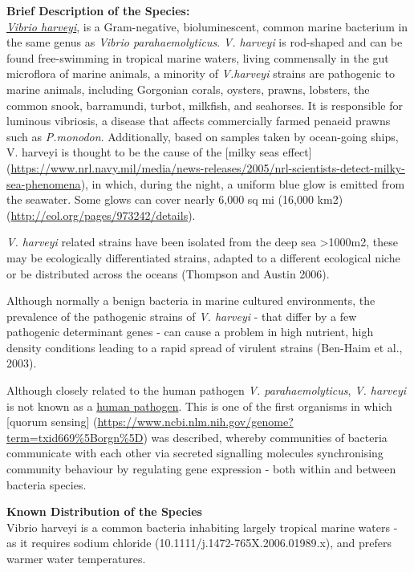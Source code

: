 \documentclass[]{book}
\theoremstyle{definition}
\theoremstyle{definition}
\theoremstyle{definition}
\theoremstyle{remark}
\begin{document}
\textbf{Brief Description of the Species:}\\
\href{http://eol.org/pages/973242/details}{\emph{Vibrio harveyi}}, is a
Gram-negative, bioluminescent, common marine bacterium in the same genus
as \emph{Vibrio parahaemolyticus}. \emph{V. harveyi} is rod-shaped and
can be found free-swimming in tropical marine waters, living commensally
in the gut microflora of marine animals, a minority of \emph{V.harveyi}
strains are pathogenic to marine animals, including Gorgonian corals,
oysters, prawns, lobsters, the common snook, barramundi, turbot,
milkfish, and seahorses. It is responsible for luminous vibriosis, a
disease that affects commercially farmed penaeid prawns such as
\emph{P.monodon}. Additionally, based on samples taken by ocean-going
ships, V. harveyi is thought to be the cause of the {[}milky seas
effect{]}
(\url{https://www.nrl.navy.mil/media/news-releases/2005/nrl-scientists-detect-milky-sea-phenomena}),
in which, during the night, a uniform blue glow is emitted from the
seawater. Some glows can cover nearly 6,000 sq mi (16,000 km2)
(\url{http://eol.org/pages/973242/details}).

\emph{V. harveyi} related strains have been isolated from the deep sea
\textgreater{}1000m2, these may be ecologically differentiated strains,
adapted to a different ecological niche or be distributed across the
oceans (Thompson and Austin 2006).

Although normally a benign bacteria in marine cultured environments, the
prevalence of the pathogenic strains of \emph{V. harveyi} - that differ
by a few pathogenic determinant genes - can cause a problem in high
nutrient, high density conditions leading to a rapid spread of virulent
strains (Ben-Haim et al., 2003).

Although closely related to the human pathogen \emph{V.
parahaemolyticus}, \emph{V. harveyi} is not known as a
\href{https://www.ncbi.nlm.nih.gov/genome?term=txid669\%5Borgn\%5D}{human
pathogen}. This is one of the first organisms in which {[}quorum
sensing{]}
(\url{https://www.ncbi.nlm.nih.gov/genome?term=txid669\%5Borgn\%5D}) was
described, whereby communities of bacteria communicate with each other
via secreted signalling molecules synchronising community behaviour by
regulating gene expression - both within and between bacteria species.

\textbf{Known Distribution of the Species}\\
Vibrio harveyi is a common bacteria inhabiting largely tropical marine
waters - as it requires sodium chloride
(10.1111/j.1472-765X.2006.01989.x), and prefers warmer water
temperatures.
\end{document}
